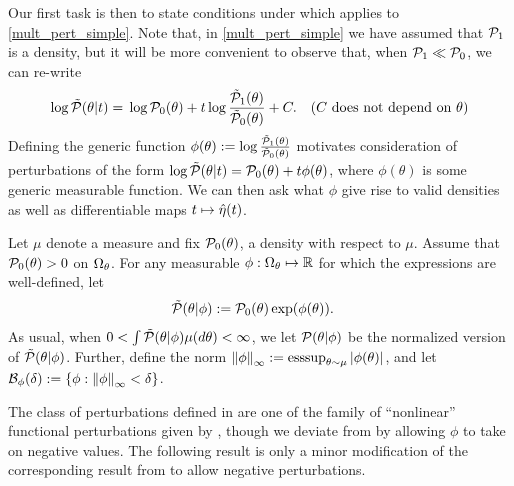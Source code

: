 Our first task is then to state conditions under which 
applies to \eqref{mult_pert_simple}.  Note that, in \eqref{mult_pert_simple} we
have assumed that $\mathcal{P}_{1}$ is a density, but it will be more convenient to
observe that, when $\mathcal{P}_{1} \ll \mathcal{P}_{0}$, we can re-write
%
\begin{align*}
%
\log \ptil(\theta \vert \t) ={}&
    \log \pbase(\theta) +
        \t \log \frac{\palttil(\theta)}{\pbasetil(\theta)} +
        \const. & \constdesc{\theta}
%
\end{align*}
%
Defining the generic function $\phi(\theta) := \log
\frac{\tilde{\mathcal{P}}_{1}(\theta)}{\tilde{\mathcal{P}}_{0}(\theta)}$ motivates consideration of
perturbations of the form $\log \tilde{\mathcal{P}}(\theta \vert t) = \mathcal{P}_{0}(\theta) + t
\phi(\theta)$, where $\phi(\theta)$ is some generic measurable function. We can
then ask what $\phi$ give rise to valid densities as well as differentiable maps
$t \mapsto \hat\eta(t)$.

\begin{defn}
%
Let $\mu$ denote a measure and fix $\mathcal{P}_{0}(\theta)$, a density with respect to
$\mu$.  Assume that $\mathcal{P}_{0}(\theta) > 0$ on $\Omega_{\theta}$. For any measurable
$\phi: \Omega_{\theta} \mapsto \mathbb{R}$ for which the expressions are well-defined,
let
%
\begin{align*}
\ptil(\theta \vert \phi) :={}& \pbase(\theta)\exp(\phi(\theta)).
%
\end{align*}
%
As usual, when $0 < \int \tilde{\mathcal{P}}(\theta \vert \phi) \mu(d\theta) < \infty$, we let
$\mathcal{P}(\theta \vert \phi)$ be the normalized version of $\tilde{\mathcal{P}}(\theta \vert \phi)$.
Further, define the norm $\left\Vert\phi\right\Vert_{\infty} := \operatorname*{\mathrm{esssup}}_{\theta \sim \mu}
\left|\phi(\theta)\right|$, and let $\mathcal{B}_\phi(\delta) := \left\{ \phi: \left\Vert\phi\right\Vert_{\infty} <
\delta \right\}$.
%
\end{defn}
%

The class of perturbations defined in  are one of the
family of ``nonlinear'' functional perturbations given by
\citet{gustafson:1996:local}, though we deviate from
\citet{gustafson:1996:local} by allowing $\phi$ to take on negative values. The
following result is only a minor modification of the corresponding result from
\citet{gustafson:1996:local} to allow negative perturbations.

